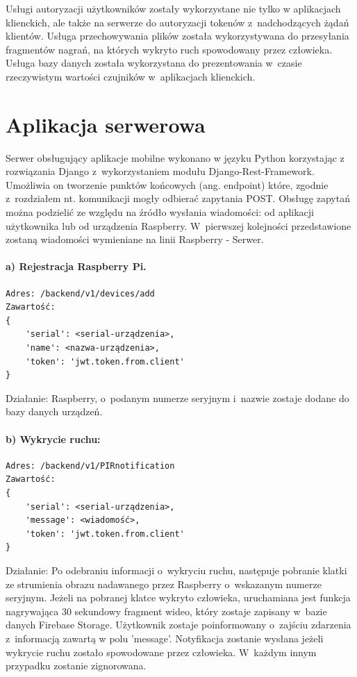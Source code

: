 Usługi autoryzacji użytkowników zostały wykorzystane nie tylko w aplikacjach klienckich, ale także na serwerze do autoryzacji tokenów z~nadchodzących żądań klientów. Usługa przechowywania plików została wykorzystywana do przesyłania fragmentów nagrań, na których wykryto ruch spowodowany przez człowieka. Usługa bazy danych została wykorzystana do prezentowania w~czasie rzeczywistym wartości czujników w~aplikacjach klienckich.


\section{Aplikacja serwerowa}

Serwer obsługujący aplikacje mobilne wykonano w języku Python korzystając z rozwiązania Django z~wykorzystaniem modułu Django-Rest-Framework. Umożliwia on tworzenie punktów końcowych (ang. endpoint) które, zgodnie z~rozdziałem nt. komunikacji mogły odbierać zapytania POST.
Obsługę zapytań można podzielić ze względu na źródło wysłania wiadomości: od aplikacji użytkownika lub od urządzenia Raspberry.
W~pierwszej kolejności przedstawione zostaną wiadomości wymieniane na linii Raspberry - Serwer.
\paragraph{a) Rejestracja Raspberry Pi.}
\begin{verbatim}
Adres: /backend/v1/devices/add
Zawartość:
{
	'serial': <serial-urządzenia>, 
	'name': <nazwa-urządzenia>, 
	'token': 'jwt.token.from.client'
}
\end{verbatim}
Działanie: Raspberry, o~podanym numerze seryjnym i~nazwie zostaje dodane do bazy danych urządzeń.

\paragraph{b) Wykrycie ruchu:}
\begin{verbatim}
Adres: /backend/v1/PIRnotification
Zawartość: 
{
	'serial': <serial-urządzenia>, 
	'message': <wiadomość>, 
	'token': 'jwt.token.from.client'
}
\end{verbatim}
Działanie: Po odebraniu informacji o~wykryciu ruchu, następuje pobranie klatki ze strumienia obrazu nadawanego przez Raspberry o~wskazanym numerze seryjnym. Jeżeli na pobranej klatce wykryto człowieka, uruchamiana jest funkcja nagrywająca 30 sekundowy fragment wideo, który zostaje zapisany w~bazie danych Firebase Storage. Użytkownik zostaje poinformowany o~zajściu zdarzenia z~informacją zawartą w polu 'message'. Notyfikacja zostanie wysłana jeżeli wykrycie ruchu zostało spowodowane przez człowieka. W~każdym innym przypadku zostanie zignorowana.

